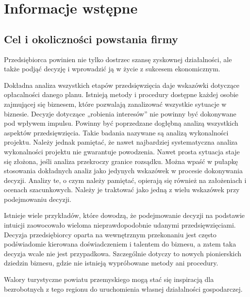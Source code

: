 \documentclass{sprawozdanie-agh}
\begin{document}
   


	\stronatytulowa{}

	\section{Informacje wstępne}

		\subsection{Cel i okoliczności powstania firmy}

		Przedsiębiorca powinien nie tylko dostrzec szansę zyskownej działalności, ale także podjąć decyzję i wprowadzić ją w życie z sukcesem ekonomicznym.
		
		Dokładna analiza wszystkich etapów przedsięwzięcia daje wskazówki dotyczące opłacalności danego planu. Istnieją metody i procedury dostępne każdej osobie zajmującej się biznesem, które pozwalają zanalizować wszystkie sytuacje w biznesie. Decyzje dotyczące „robienia interesów” nie powinny być dokonywane pod wpływem impulsu. Powinny być poprzedzane dogłębną analizą wszystkich aspektów przedsięwzięcia. Takie badania nazywane są analizą wykonalności projektu. Należy jednak pamiętać, że nawet najbardziej systematyczna analiza wykonalności projektu nie gwarantuje powodzenia. Nawet prosta sytuacja staje się złożona, jeśli analiza przekroczy granice rozsądku. Można wpaść w pułapkę stosowania dokładnych analiz jako jedynych wskazówek w procesie dokonywania decyzji. Analizy te, o czym należy pamiętać, opierają się również na założeniach i ocenach szacunkowych. Należy je traktować jako jedną z wielu wskazówek przy podejmowaniu decyzji.
		
		Istnieje wiele przykładów, które dowodzą, że podejmowanie decyzji na podstawie intuicji zaowocowało wieloma nieprawdopodobnie udanymi przedsięwzięciami. Decyzja przedsiębiorcy oparta na wewnętrznym przekonaniu jest często podświadomie kierowana doświadczeniem i talentem do biznesu, a zatem taka decyzja wcale nie jest przypadkowa. Szczególnie dotyczy to nowych pionierskich dziedzin biznesu, gdzie nie istnieją wypróbowane metody ani procedury.
		
		Walory turystyczne powiatu przemyskiego mogą stać się inspiracją dla bezrobotnych z tego regionu do uruchomienia własnej działalności gospodarczej.
		
\end{document}

